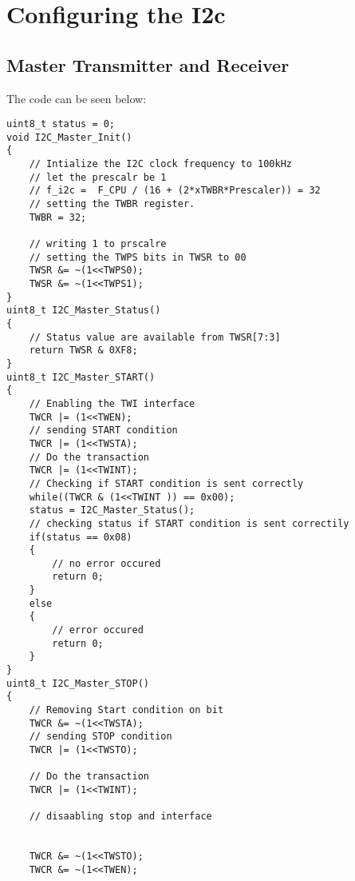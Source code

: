 \documentclass{article}
\begin{document}
\section{Configuring the I2c}
\subsection{Master Transmitter and Receiver}

\quad The code can be seen below:

\begin{verbatim}
uint8_t status = 0;
void I2C_Master_Init()
{
	// Intialize the I2C clock frequency to 100kHz
	// let the prescalr be 1
	// f_i2c =  F_CPU / (16 + (2*xTWBR*Prescaler)) = 32
	// setting the TWBR register.
	TWBR = 32;

	// writing 1 to prscalre
	// setting the TWPS bits in TWSR to 00
	TWSR &= ~(1<<TWPS0);
	TWSR &= ~(1<<TWPS1);
}
uint8_t I2C_Master_Status()
{
	// Status value are available from TWSR[7:3]
	return TWSR & 0XF8;
}
uint8_t I2C_Master_START()
{
	// Enabling the TWI interface
	TWCR |= (1<<TWEN);
	// sending START condition
	TWCR |= (1<<TWSTA);
	// Do the transaction
	TWCR |= (1<<TWINT);
	// Checking if START condition is sent correctly
	while((TWCR & (1<<TWINT )) == 0x00);
	status = I2C_Master_Status();
	// checking status if START condition is sent correctily
	if(status == 0x08)
	{
		// no error occured
		return 0;
	}
	else
	{
		// error occured
		return 0;
	}
}
uint8_t I2C_Master_STOP()
{
	// Removing Start condition on bit
	TWCR &= ~(1<<TWSTA);
	// sending STOP condition
	TWCR |= (1<<TWSTO);
	
	// Do the transaction
	TWCR |= (1<<TWINT);

	// disaabling stop and interface
	
	
	TWCR &= ~(1<<TWSTO);
	TWCR &= ~(1<<TWEN);


\end{verbatim}
\end{document}

